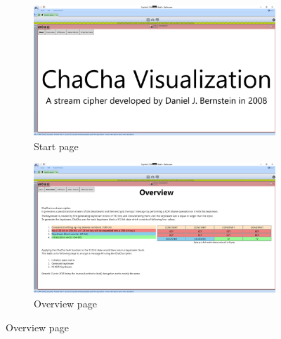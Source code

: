 \begin{figure}
\centering
\begin{subfigure}{\textwidth}
  \centering
  \includegraphics[width=\textwidth]{figures/ct2/all-pages/1-start.png}
  \caption{Start page}
\end{subfigure}
\begin{subfigure}{\textwidth}
  \centering
  \includegraphics[width=\textwidth]{figures/ct2/all-pages/2-overview.png}
  \caption{Overview page}
\end{subfigure}
\end{figure}
